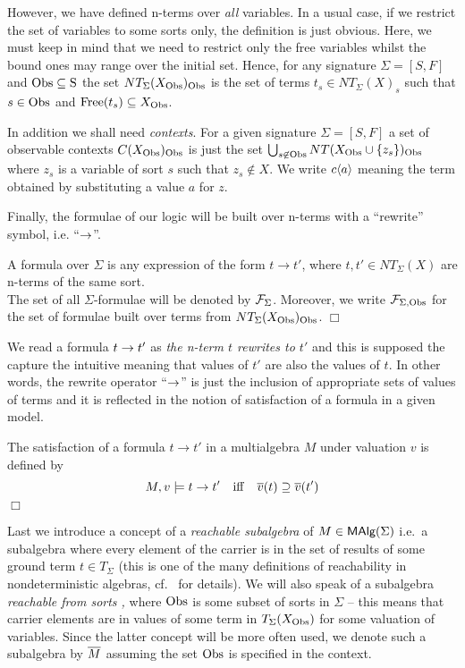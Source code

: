 \medskip
However, we have defined n-terms over {\em all} variables. In a usual
case, if we restrict the set of variables to some sorts only, the
definition is just obvious. Here, we must keep in mind that we need to
restrict only the free variables whilst the bound ones may range over
the initial set. Hence, for any signature $\Sigma = [S,F]$ and $\rm Obs
\subseteq S$ the set $NT_{\Sigma}(X_{\rm Obs})_{\rm Obs}$ is the set of terms
$t_s \in NT_{\Sigma}(X)_s$ such that $s \in \rm Obs$ and ${\rm Free}(t_s)
\subseteq X_{\rm Obs}$.

In addition we shall need {\em contexts}. For a given signature
$\Sigma = [S,F]$ a set of observable contexts $C(X_{\rm Obs})_{\rm Obs}$ is
just the set $\bigcup_{s \not\in \rm Obs} NT(X_{\rm Obs} \cup 
\{z_s\})_{\rm Obs}$ where $z_s$ is a variable of sort $s$ such that $z_s
\not\in X$. We write $c\langle a \rangle$ meaning the term obtained by
substituting a value $a$ for $z$. 

Finally, the formulae of our logic will be built over n-terms with a
``rewrite'' symbol, i.e. ``$\rightarrow$''.

\begin{Definition}
A formula over $\Sigma$ is any expression of the form $t \rightarrow
t'$, where $t, t'\in NT_{\Sigma}(X)$ are n-terms of the same sort. \\
The set of all $\Sigma$-formulae will be denoted by ${\cal
F}_\Sigma$. Moreover, we write ${\cal F}_{\Sigma,\rm Obs}$ for
the set of formulae built over terms from
$NT_{\Sigma}(X_{\rm Obs})_{\rm Obs}$.
\hfill$\Box$ 
\end{Definition}
%
We read a formula $t \rightarrow t'$ as {\em the n-term $t$ rewrites to $t'$}
and this is supposed the capture the intuitive meaning that values of
$t'$ are also the values of $t$. In other words, the rewrite operator
``$\rightarrow$'' is just the inclusion of appropriate sets of values of terms
and it is reflected in the notion of satisfaction of a formula in a
given model.

\begin{Definition}
The satisfaction of a formula $t\rightarrow t'$ in a multialgebra $M$
under valuation $v$ is defined by
\[ 
M,v \models t\rightarrow t' \quad {\rm iff} \quad \mbox{$\overline{v}$}(t)
\supseteq \mbox{$\overline{v}$}(t')
\] 
\hfill$\Box$ 
\end{Definition}

Last we introduce a concept of a {\em reachable subalgebra} of $M \in
\mbox{\rm\sf MAlg}(\Sigma)$ i.e.\ a subalgebra where every element of the carrier
is in the set of results of some ground term $t \in T_{\Sigma}$ (this
is one of the many definitions of reachability in nondeterministic
algebras, cf.\ \cite{WM95} for details). We will also speak of a
subalgebra {\em reachable from sorts \Obs,} where $\rm Obs$ is some subset
of sorts in $\Sigma$ -- this means that carrier elements are in values
of some term in $T_\Sigma(X_{\rm Obs})$ for some valuation of
variables. Since the latter concept will be more often used, we denote
such a subalgebra by $\mbox{$\overline{M}$}$ assuming the set $\rm Obs$ is specified in
the context.

